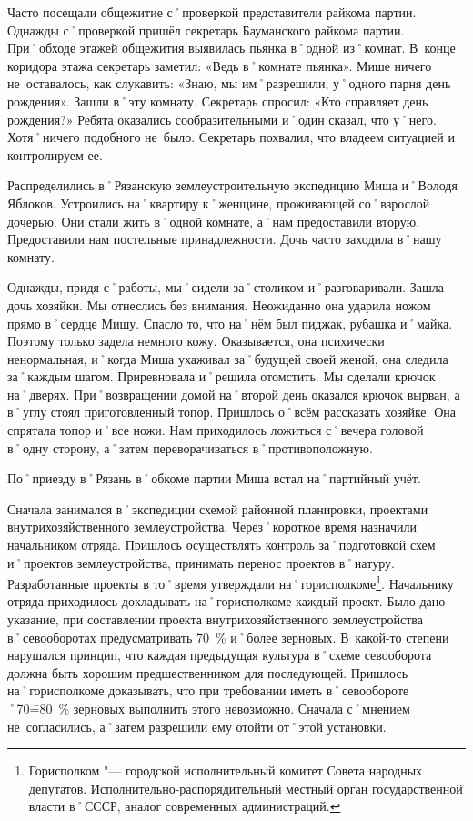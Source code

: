 Часто посещали общежитие с˚проверкой представители райкома партии. Однажды с˚проверкой пришёл секретарь Бауманского райкома партии. При˚обходе этажей общежития выявилась пьянка в˚одной из˚комнат. В~конце коридора этажа секретарь заметил: «Ведь в˚комнате пьянка». Мише ничего не~оставалось, как слукавить: «Знаю, мы им˚разрешили, у˚одного парня день рождения». Зашли в˚эту комнату. Секретарь спросил: «Кто справляет день рождения?» Ребята оказались сообразительными и˚один сказал, что у˚него. Хотя˚ничего подобного не~было. Секретарь похвалил, что владеем ситуацией и контролируем ее.

Распределились в˚Рязанскую землеустроительную экспедицию Миша и˚Володя Яблоков. Устроились на˚квартиру к˚женщине, проживающей со˚взрослой дочерью. Они стали жить в˚одной комнате, а˚нам предоставили вторую. Предоставили нам постельные принадлежности. Дочь часто заходила в˚нашу комнату.

Однажды, придя с˚работы, мы˚сидели за˚столиком и˚разговаривали. Зашла дочь хозяйки. Мы отнеслись без внимания. Неожиданно она ударила ножом прямо в˚сердце Мишу. Спасло то, что на˚нём был пиджак, рубашка и˚майка. Поэтому только задела немного кожу. Оказывается, она психически ненормальная, и˚когда Миша ухаживал за˚будущей своей женой, она следила за˚каждым шагом. Приревновала и˚решила отомстить. Мы сделали крючок на˚дверях. При˚возвращении домой на˚второй день оказался крючок вырван, а в˚углу стоял приготовленный топор. Пришлось о˚всём рассказать хозяйке. Она спрятала топор и˚все ножи. Нам приходилось ложиться с˚вечера головой в˚одну сторону, а˚затем переворачиваться в˚противоположную.

По˚приезду в˚Рязань в˚обкоме партии Миша встал на˚партийный учёт.

Сначала занимался в˚экспедиции схемой районной планировки, проектами внутрихозяйственного землеустройства. Через˚короткое время назначили начальником отряда. Пришлось осуществлять контроль за˚подготовкой схем и˚проектов землеустройства, принимать перенос проектов в˚натуру. Разработанные проекты в то˚время утверждали на˚горисполкоме\footnote{Горисполком "--- городской исполнительный комитет Совета народных депутатов. Исполнительно-распорядительный местный орган государственной власти в˚СССР, аналог современных администраций.}. Начальнику отряда приходилось докладывать на˚горисполкоме каждый проект. Было дано указание, при составлении проекта внутрихозяйственного землеустройства в˚севооборотах предусматривать 70~\% и˚более зерновых. В~какой-то степени нарушался принцип, что каждая предыдущая культура в˚схеме севооборота должна быть хорошим предшественником для последующей. Пришлось на˚горисполкоме доказывать, что при требовании иметь в˚севообороте ˚70\==80~\% зерновых выполнить этого невозможно. Сначала с˚мнением не~согласились, а˚затем разрешили ему отойти от˚этой установки.

